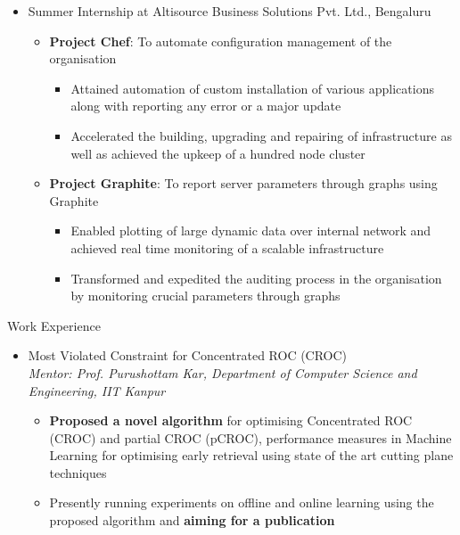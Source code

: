 \documentclass{article}
\begin{document}
\renewcommand{\labelitemi}{}
\renewcommand\labelitemii{$\circ$}
\renewcommand{\labelitemiii}{$\bullet$}
\begin{itemize}[leftmargin=0.07cm]
\item {\large Summer Internship at Altisource Business Solutions Pvt. Ltd., Bengaluru}\hspace*{\fill}
\vspace{-0cm}
	\begin{itemize}[leftmargin=0.07cm]
	\item \textbf{Project Chef}: To automate configuration management of the organisation\\
	\vspace{-0.2cm}
	\begin{itemize}
	\item Attained automation of custom installation of various applications along with reporting any error or a major update
	\item Accelerated the building, upgrading and repairing of infrastructure as well as achieved the upkeep of a hundred node cluster \end{itemize}
	\vspace{0cm}
	\item \textbf{Project Graphite}: To report server parameters through graphs using Graphite\\
	\vspace{-0.2cm}
	\begin{itemize}
	\item Enabled plotting of large dynamic data over internal network and achieved real time monitoring of a scalable infrastructure 
	\item Transformed and expedited the auditing process in the organisation by monitoring crucial parameters through graphs 
	\end{itemize}
	\end{itemize}
\end{itemize}
{\Large Work Experience}
\renewcommand{\labelitemii}{$\bullet$}
\begin{itemize}[leftmargin=0.07cm]
\item[] {\large Most Violated Constraint for Concentrated ROC (CROC)}\hspace*{\fill}\\
\emph{Mentor: Prof. Purushottam Kar, Department of Computer Science and Engineering, IIT Kanpur
}	\begin{itemize}
	\item \textbf{Proposed a novel algorithm} for optimising Concentrated ROC (CROC) and partial CROC (pCROC), performance measures in Machine Learning for optimising early retrieval using state of the art cutting plane techniques
	\item Presently running experiments on offline and online learning using the proposed algorithm and \textbf{aiming for a publication}
	\end{itemize}
	\end{itemize}
\end{document}
